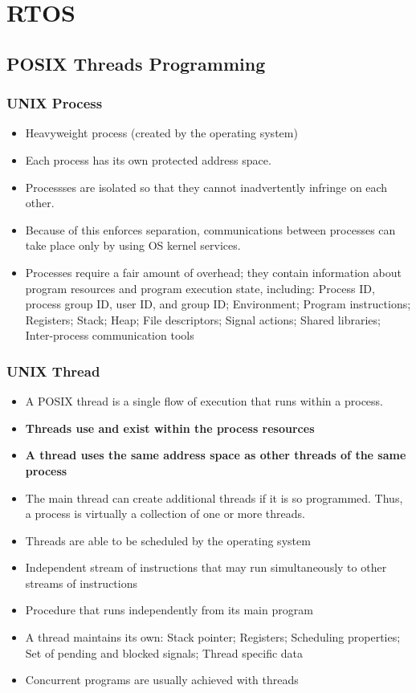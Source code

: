 \section{RTOS}
\subsection{POSIX Threads Programming}
\subsubsection{UNIX Process}
\begin{itemize}
    \item Heavyweight process (created by the operating system)
    \item Each process has its own protected address space.
    \item Processses are isolated so that they cannot inadvertently infringe on each other.
    \item Because of this enforces separation, communications between processes can take place only by using OS kernel services.
    \item Processes require a fair amount of overhead; they contain information about program resources and program execution state, including: Process ID, process group ID, user ID, and group ID; Environment; Program instructions; Registers; Stack; Heap; File descriptors; Signal actions; Shared libraries; Inter-process communication tools
\end{itemize}

\subsubsection{UNIX Thread}
\begin{itemize}
    \item A POSIX thread is a single flow of execution that runs within a process.
    \item \textbf{Threads use and exist within the process resources}
    \item \textbf{A thread uses the same address space as other threads of the same process}
    \item The main thread can create additional threads if it is so programmed.
          Thus, a process is virtually a collection of one or more threads.
    \item Threads are able to be scheduled by the operating system
    \item Independent stream of instructions that may run simultaneously to other streams of instructions
    \item Procedure that runs independently from its main program
    \item A thread maintains its own: Stack pointer; Registers; Scheduling properties; Set of pending and blocked signals; Thread specific data
    \item Concurrent programs are usually achieved with threads
\end{itemize}

